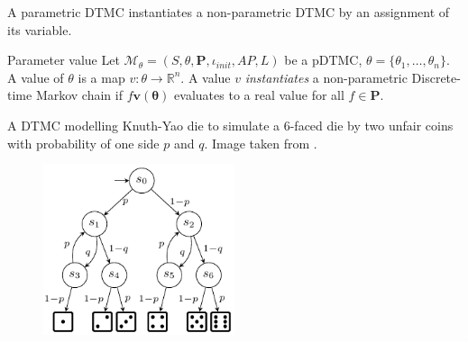 A parametric DTMC instantiates a non-parametric DTMC by an assignment of its variable.
\begin{definition}{Parameter value}
    Let $\mathcal{M}_\theta = (S, \theta, \mathbf{P}, \iota_{init}, AP, L)$ be a pDTMC,
    $\theta=\{\theta_1,\ldots,\theta_n\}$. A value of $\theta$ is a map $v: \theta
        \rightarrow \mathbb{R}^n$. A value $v$ \textit{instantiates} a non-parametric
    Discrete-time Markov chain if $f{\mathbf{v(\theta)}}$ evaluates to a real value for all
    $f\in\mathbf{P}$.
\end{definition}
\begin{example}
    A DTMC modelling Knuth-Yao die to simulate a 6-faced die by two unfair coins with probability of
    one side $p$ and $q$. Image taken from \cite{katoen2016probabilistic}.
    \begin{figure}[H]
        \centering
        \includegraphics[width=0.5\textwidth]{figures/knuth_die_pq.png}
        \label{fig:knuth-die-pq}
    \end{figure}
\end{example}

